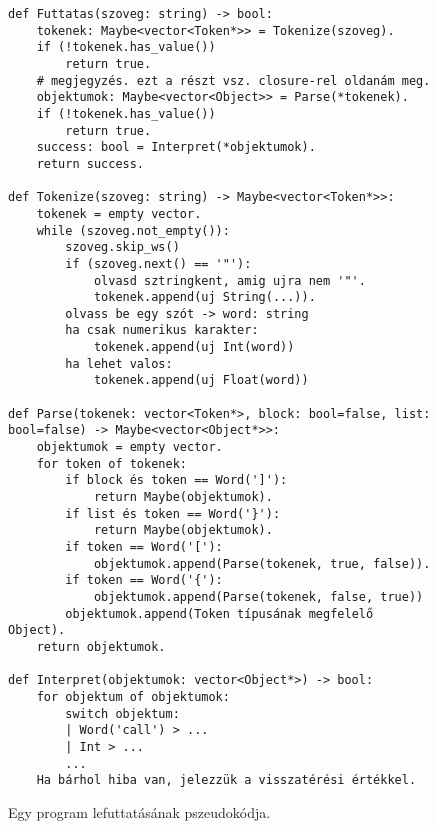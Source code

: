 \documentclass[a4paper]{article}
\begin{document}
\begin{figure}[h]
\caption{Egy program lefuttatásának pszeudokódja.}
\begin{verbatim}
def Futtatas(szoveg: string) -> bool:
    tokenek: Maybe<vector<Token*>> = Tokenize(szoveg).
    if (!tokenek.has_value())
        return true.
    # megjegyzés. ezt a részt vsz. closure-rel oldanám meg.
    objektumok: Maybe<vector<Object>> = Parse(*tokenek).
    if (!tokenek.has_value())
        return true.
    success: bool = Interpret(*objektumok).
    return success.

def Tokenize(szoveg: string) -> Maybe<vector<Token*>>:
    tokenek = empty vector.
    while (szoveg.not_empty()):
        szoveg.skip_ws()
        if (szoveg.next() == '"'):
            olvasd sztringkent, amig ujra nem '"'.
            tokenek.append(uj String(...)).
        olvass be egy szót -> word: string
        ha csak numerikus karakter: 
            tokenek.append(uj Int(word))
        ha lehet valos:
            tokenek.append(uj Float(word))

def Parse(tokenek: vector<Token*>, block: bool=false, list: bool=false) -> Maybe<vector<Object*>>:
    objektumok = empty vector.
    for token of tokenek:
        if block és token == Word(']'):
            return Maybe(objektumok).
        if list és token == Word('}'):
            return Maybe(objektumok).
        if token == Word('['):
            objektumok.append(Parse(tokenek, true, false)).
        if token == Word('{'):
            objektumok.append(Parse(tokenek, false, true))
        objektumok.append(Token típusának megfelelő Object).
    return objektumok.

def Interpret(objektumok: vector<Object*>) -> bool:
    for objektum of objektumok:
        switch objektum:
        | Word('call') > ...
        | Int > ...
        ...
    Ha bárhol hiba van, jelezzük a visszatérési értékkel.

\end{verbatim}
\end{figure}
\end{document}
